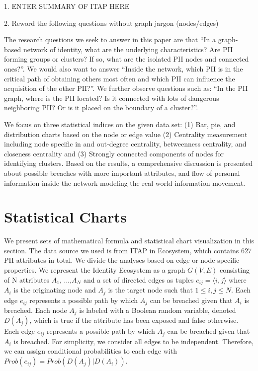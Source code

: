 \documentclass[conference]{IEEEtran}
\begin{document}
{\color{red} 1. ENTER SUMMARY OF ITAP HERE}

{\color{red} 2. Reword the following questions without graph jargon (nodes/edges)}

 The research questions we seek to answer in this paper are that ``In a graph-based network of identity, what are the underlying characteristics? Are PII forming groups or clusters? If so, what are the isolated PII nodes and connected ones?''. We would also want to answer ``Inside the network, which PII is in the critical path of obtaining others most often and which PII can influence the acquisition of the other PII?''. We further observe questions such as: ``In the PII graph, where is the PII located? Is it connected with lots of dangerous neighboring PII? Or is it placed on the boundary of a cluster?''.

We focus on three statistical indices on the given data set: (1) Bar, pie, and distribution charts based on the node or edge value (2) Centrality measurement including node specific in and out-degree centrality, betweenness centrality, and closeness centrality and (3) Strongly connected  components of nodes for identifying clusters. Based on the results, a comprehensive discussion is presented about possible breaches with more important attributes, and flow of personal information inside the network modeling the real-world information movement. 



\section{Statistical Charts}

We present sets of mathematical formula and statistical chart visualization in this section. The data source we used is from ITAP in Ecosystem, which contains 627 PII attributes in total. We divide the analyses based on edge or node specific properties. We represent the Identity Ecosystem as a graph $G(V, E)$ consisting of N attributes $A_{1}$, ...,$A_{N}$ and a set of directed edges as tuples $e_{ij} = \langle i, j \rangle$ where $A_{i}$ is the originating node and $A_{j}$ is the target node such that $1 \leq i, j \leq N$. Each edge $e_{ij}$ represents a possible path by which $A_{j}$ can be breached given that $A_{i}$ is breached. Each node $A_{j}$ is labeled with a Boolean random variable, denoted $D(A_{j})$, which is true if the attribute has been exposed and false otherwise. Each edge $e_{ij}$ represents a possible path by which $A_{j}$ can be breached given that $A_{i}$ is breached. For simplicity, we consider all edges to be independent. Therefore, we can assign conditional probabilities to each edge with $Prob(e_{ij}) = Prob(D(A_{j})|D(A_{i}))$.
\end{document}
